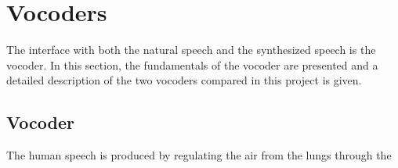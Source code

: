 \section{Vocoders}
\label{vocoders}
The interface with both the natural speech and the synthesized speech is the vocoder. In this section, the fundamentals of the vocoder are presented and a detailed description of the two vocoders compared in this project is given.

\subsection{Vocoder}
\label{vocoders_vocoder}
The human speech is produced by regulating the air from the lungs through the 